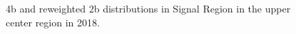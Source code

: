 \begin{figure}[ht]
 
 
    \caption{4b and reweighted 2b distributions in Signal Region in the upper center region in 2018.}
    \label{fig:upper-center-4b-SR-2018}
\end{figure}


